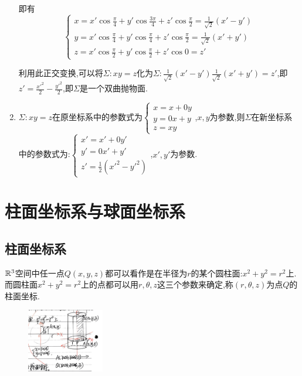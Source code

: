 \begin{solution}
\begin{enumerate}
即有
$$
\begin{cases}
    x = x' \cos \frac{\pi}{4} + y' \cos \frac{3\pi}{4} + z' \cos \frac{\pi}{2} = \frac{1}{\sqrt{2}}(x'-y')\\
    y = x' \cos \frac{\pi}{4} + y' \cos \frac{\pi}{4} + z' \cos \frac{\pi}{2} = \frac{1}{\sqrt{2}}(x'+y')\\
    z = x' \cos \frac{\pi}{2} + y' \cos \frac{\pi}{2} + z' \cos 0 = z'
\end{cases}
$$

利用此正交变换,可以将$\Sigma:xy=z$化为$\Sigma: \frac{1}{\sqrt{2}}(x'-y')\frac{1}{\sqrt{2}}(x'+y')=z'$,即$z' = \frac{x'^2}{2} - \frac{y'^2}{2}$,即$\Sigma$是一个双曲抛物面.
\item $\Sigma:xy = z$在原坐标系中的参数式为$\begin{cases}
    x = x+0y\\
    y = 0x+y\\
    z = xy
\end{cases}$,$x,y$为参数,则$\Sigma$在新坐标系中的参数式为:$\begin{cases}
    x' = x' +0y'\\
    y' = 0x'+y'\\
    z' = \frac{1}{2}(x'^2-y'^2)
\end{cases}$,$x',y'$为参数.

\end{enumerate}
\end{solution}

\section{柱面坐标系与球面坐标系}

\subsection{柱面坐标系}

$\mathbb{R}^3$空间中任一点$Q(x,y,z)$都可以看作是在半径为$r$的某个圆柱面:$x^2+y^2 = r^2$上.而圆柱面$x^2+y^2=r^2$上的点都可以用$r,\theta,z$这三个参数来确定,称$(r,\theta,z)$为点$Q$的柱面坐标.

\begin{figure}[htbp]
    \centering
    \includegraphics[width=0.3\textwidth]{figure/5-2.png}
    \caption{}
\end{figure}

